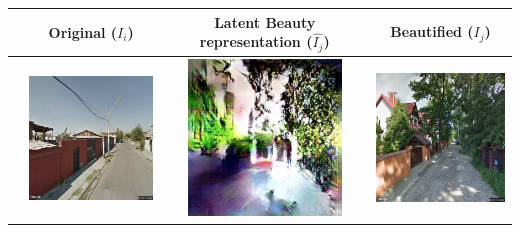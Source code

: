 \begin{table}\sffamily
    \begin{tabular}{l*3{C}@{}}
        \toprule
        & Original ($I_i$) & Latent Beauty representation ($\hat{I_j}$) & Beautified ($I_j$) \\ 
        \midrule
        & \includegraphics[width=11em]{u_9.png} & \includegraphics[width=11em]{t_9.png} &  \includegraphics[width=11em]{b_9.png} \\ 

\end{tabular}
\end{table}
